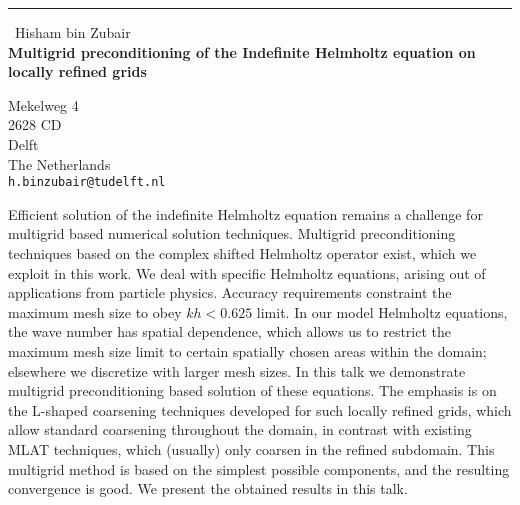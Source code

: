 \documentclass{report}
\begin{document}
\begin{center}
\rule{6in}{1pt} \
{\large Hisham bin Zubair \\
{\bf Multigrid preconditioning of the Indefinite Helmholtz equation on locally refined grids}}

Mekelweg 4 \\ 2628 CD \\ Delft \\ The Netherlands
\\
{\tt h.binzubair@tudelft.nl}\end{center}

Efficient solution of the indefinite Helmholtz equation remains a
challenge for multigrid based numerical solution techniques. Multigrid
preconditioning techniques based on the complex shifted Helmholtz
operator exist, which we exploit in this work. We deal with specific
Helmholtz equations, arising out of applications from particle physics.
Accuracy requirements constraint the maximum mesh size to obey $kh <
0.625$ limit. In our model Helmholtz equations, the wave number has
spatial dependence, which allows us to restrict the maximum mesh size
limit to certain spatially chosen areas within the domain; elsewhere we
discretize with larger mesh sizes. In this talk we demonstrate multigrid
preconditioning based solution of these equations. The emphasis is on the
L-shaped coarsening techniques developed for such locally refined grids,
which allow standard coarsening throughout the domain, in contrast with
existing MLAT techniques, which (usually) only coarsen in the refined
subdomain. This multigrid method is based on the simplest possible
components, and the resulting convergence is good. We present the
obtained results in this talk.
\end{document}
